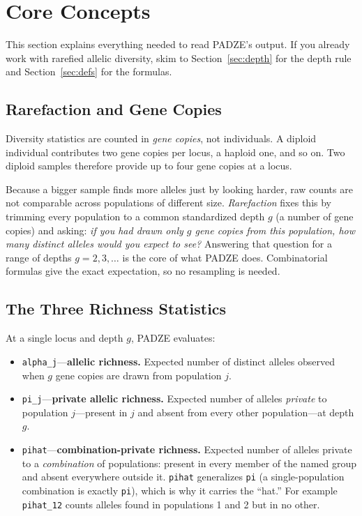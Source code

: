 \documentclass[11pt]{article}
\newcommand{\padze}{PADZE}
\begin{document}
\section{Core Concepts}
\label{sec:concepts}

This section explains everything needed to read \padze{}'s output. If you
already work with rarefied allelic diversity, skim to
Section~\ref{sec:depth} for the depth rule and Section~\ref{sec:defs} for the
formulas.

\subsection{Rarefaction and Gene Copies}

Diversity statistics are counted in \emph{gene copies}, not individuals. A
diploid individual contributes two gene copies per locus, a haploid one, and so
on. Two diploid samples therefore provide up to four gene copies at a locus.

Because a bigger sample finds more alleles just by looking harder, raw counts are
not comparable across populations of different size. \emph{Rarefaction} fixes
this by trimming every population to a common standardized depth \(g\) (a number
of gene copies) and asking: \emph{if you had drawn only \(g\) gene copies from
this population, how many distinct alleles would you expect to see?} Answering
that question for a range of depths \(g = 2, 3, \dots\) is the core of what
\padze{} does. Combinatorial formulas give the exact expectation, so no
resampling is needed.

\subsection{The Three Richness Statistics}

At a single locus and depth \(g\), \padze{} evaluates:

\begin{itemize}
  \item \texttt{alpha\_j}---\textbf{allelic richness.} Expected number of
        distinct alleles observed when \(g\) gene copies are drawn from
        population \(j\).
  \item \texttt{pi\_j}---\textbf{private allelic richness.} Expected number of
        alleles \emph{private} to population \(j\)---present in \(j\) and absent
        from every other population---at depth \(g\).
  \item \texttt{pihat}---\textbf{combination-private richness.} Expected number
        of alleles private to a \emph{combination} of populations: present in
        every member of the named group and absent everywhere outside it.
        \texttt{pihat} generalizes \texttt{pi} (a single-population combination
        is exactly \texttt{pi}), which is why it carries the ``hat.'' For
        example \texttt{pihat\_12} counts alleles found in populations 1 and 2
        but in no other.
\end{itemize}
\end{document}
